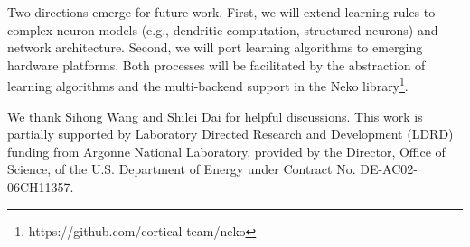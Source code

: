 \documentclass[sigconf,dvipsnames]{acmart}
\begin{document}
Two directions emerge for future work.
First, we will extend learning rules to complex neuron models (e.g., dendritic computation, structured neurons) and network architecture.
Second, we will port learning algorithms to emerging hardware platforms.
Both processes will be facilitated by the abstraction of learning algorithms and the multi-backend support in the Neko library\footnote{https://github.com/cortical-team/neko}.

\pagebreak
\begin{acks}
We thank Sihong Wang and Shilei Dai for helpful discussions. 
This work is partially supported by Laboratory Directed Research and Development (LDRD) funding from Argonne National Laboratory, provided by the Director, Office of Science, of the U.S. Department of Energy under Contract No. DE-AC02-06CH11357.
\end{acks}







\end{document}
